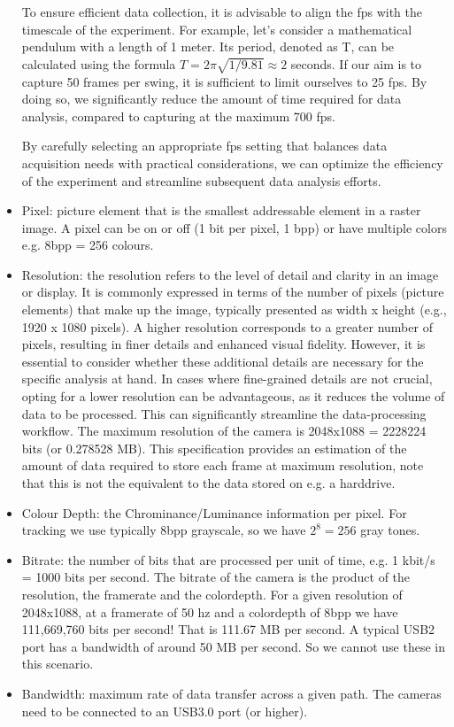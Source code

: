 \documentclass{article}
\begin{document}
\begin{itemize}
    To ensure efficient data collection, it is advisable to align the fps with the timescale of the experiment. For example, let's consider a mathematical pendulum with a length of 1 meter. Its period, denoted as T, can be calculated using the formula $T = 2\pi \sqrt{1/9.81} \approx 2$ seconds. If our aim is to capture 50 frames per swing, it is sufficient to limit ourselves to 25 fps. By doing so, we significantly reduce the amount of time required for data analysis, compared to capturing at the maximum 700 fps.
    
    By carefully selecting an appropriate fps setting that balances data acquisition needs with practical considerations, we can optimize the efficiency of the experiment and streamline subsequent data analysis efforts. 

    \item Pixel: picture element that is the smallest addressable element in a raster image. A pixel can be on or off (1 bit per pixel, 1 bpp) or have multiple colors e.g. 8bpp = 256 colours.
    
    \item Resolution: the resolution refers to the level of detail and clarity in an image or display. It is commonly expressed in terms of the number of pixels (picture elements) that make up the image, typically presented as width x height (e.g., 1920 x 1080 pixels). A higher resolution corresponds to a greater number of pixels, resulting in finer details and enhanced visual fidelity. However, it is essential to consider whether these additional details are necessary for the specific analysis at hand. In cases where fine-grained details are not crucial, opting for a lower resolution can be advantageous, as it reduces the volume of data to be processed. This can significantly streamline the data-processing workflow. The maximum resolution of the camera is 2048x1088 = 2228224 bits (or 0.278528 MB). This specification provides an estimation of the amount of data required to store each frame at maximum resolution, note that this is not the equivalent to the data stored on e.g. a harddrive.

    \item Colour Depth: the Chrominance/Luminance information per pixel. 
    For tracking we use typically 8bpp grayscale, so we have $2^8 = 256$ gray tones. 
    \item Bitrate: the number of bits that are processed per unit of time, e.g. 1 kbit/s = 1000 bits per second.
    The bitrate of the camera is the product of the resolution, the framerate and the colordepth. 
    For a given resolution of 2048x1088, at a framerate of 50 hz and a colordepth of 8bpp we have 111,669,760 bits per second! That is 111.67 MB per second. A typical USB2 port has a bandwidth of around 50 MB per second. So we cannot use these in this scenario.
    \item Bandwidth: maximum rate of data transfer across a given path. The cameras need to be connected to an USB3.0 port (or higher).
\end{itemize}
\end{document}
